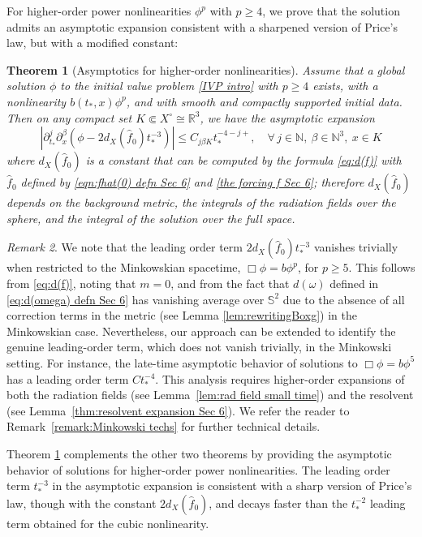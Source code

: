 \documentclass[10pt,a4paper,reqno]{amsart}
\newcommand{\pa}{\partial}
\newtheorem{theorem}{Theorem}[section]
\theoremstyle{definition}
\theoremstyle{remark}
\newtheorem{remark}[theorem]{Remark}
\numberwithin{equation}{section}
\newcommand{\R}{\mathbb R}
\newcommand{\ts}{t_*}
\newcommand{\wh}{\widehat}
\begin{document}
For higher-order power nonlinearities $\phi^p$ with $p \geq 4$, we prove that the solution admits an asymptotic expansion consistent with a sharpened version of Price's law, but with a modified constant:
\begin{theorem}[Asymptotics for higher-order nonlinearities]\label{thm:highorder}
Assume that a global solution $\phi$ to the initial value problem \eqref{IVP intro} with $p\geq 4$ exists, with a nonlinearity $b(\ts,x) \phi^p$, and with smooth and compactly supported initial data. Then on any compact set $K \Subset X^\circ \cong \R^3$, we have the asymptotic expansion 
\begin{equation}
\label{phi asymp spatial compact highorder}
|\pa_{\ts}^j \pa_x^\beta (\phi - 2d_X(\wh{f}_0) t_*^{-3})|\leq C_{j\beta K} t_*^{-4-j+},\quad \forall\, j\in\mathbb{N},\ \beta\in\mathbb{N}^3, \ x \in K
\end{equation}
where $d_X(\wh{f}_0)$ is a constant that can be computed by the formula \eqref{eq:d(f)} with $\wh{f}_0$ defined by \eqref{eqn:fhat(0) defn Sec 6} and \eqref{the forcing f Sec 6}; therefore $d_X(\wh{f}_0)$ depends on the background metric, the integrals of the radiation fields over the sphere, and the integral of the solution over the full space.
\end{theorem}

\begin{remark}
We note that the leading order term $2d_X(\wh{f}_0) t_*^{-3}$ vanishes trivially when restricted to the Minkowskian spacetime, $\Box\phi = b\phi^p$, for $p\geq 5$. This follows from \eqref{eq:d(f)}, noting that $m=0$, and from the fact that $d(\omega)$ defined in \eqref{eq:d(omega) defn Sec 6} has vanishing average over $\mathbb{S}^2$ due to the absence of all correction terms in the metric (see Lemma \ref{lem:rewritingBoxg}) in the Minkowskian case. Nevertheless, our approach can be extended to identify the genuine leading-order term, which does not vanish trivially, in the Minkowski setting. For instance, the late-time asymptotic behavior of solutions to $\Box\phi = b\phi^5$ has a leading order term $C t_*^{-4}$. This analysis requires higher-order expansions of both the radiation fields (see Lemma~\ref{lem:rad field small time}) and the resolvent (see Lemma~\ref{thm:resolvent expansion Sec 6}). We refer the reader to Remark~\ref{remark:Minkowski techs} for further technical details.
\end{remark}

Theorem \ref{thm:highorder} complements the other two theorems by providing the asymptotic behavior of solutions for higher-order power nonlinearities. The leading order term $t_*^{-3}$ in the asymptotic expansion is consistent with a sharp version of Price's law, though with the constant $2d_X(\wh{f}_0)$, and decays faster than the $t_*^{-2}$ leading term obtained for the cubic nonlinearity. 
\end{document}
